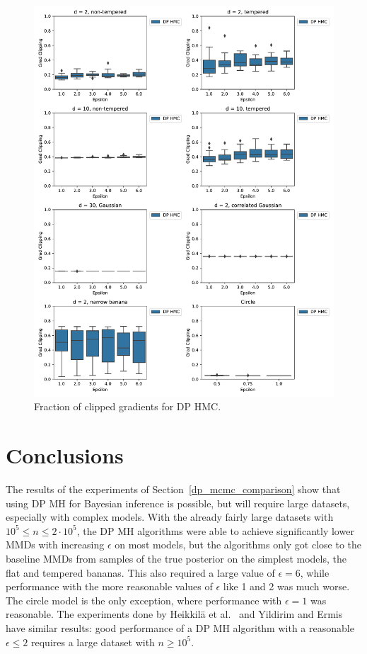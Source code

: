 \documentclass[english,twoside,openright]{HYgraduMLDS}
\begin{document}
\begin{figure}
  \centering
  \includegraphics[width=\textwidth]{figures/grad_clipping}
  \caption{
    Fraction of clipped gradients for DP HMC.
  }
  \label{grad_clipping_fig}
\end{figure}

\chapter{Conclusions}\label{conclusion_chapter}

The results of the experiments of Section~\ref{dp_mcmc_comparison} show that
using DP MH for Bayesian inference is possible, but will require large
datasets, especially with complex models. With the already fairly large datasets
with \(10^{5} \leq n \leq 2\cdot 10^{5}\), the DP MH algorithms were able to
achieve significantly lower MMDs with increasing \(\epsilon\) on most models,
but the algorithms only got close to the baseline MMDs from samples of the
true posterior on the simplest models, the flat and tempered bananas. This also
required a large value of \(\epsilon = 6\), while performance with the more
reasonable values of \(\epsilon\) like 1 and 2 was much worse. The circle model
is the only exception, where performance with \(\epsilon = 1\) was reasonable.
The experiments done by Heikkilä et al.~\cite{HeikkilaJDH19}
and Yildirim and Ermis~\cite{YildirimE19} have similar results: good performance
of a DP MH algorithm with a reasonable \(\epsilon \leq 2\) requires a large
dataset with \(n \geq 10^{5}\).
\end{document}

